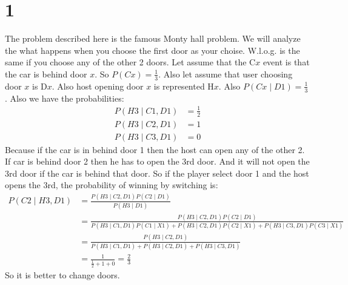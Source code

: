 \section*{1}
The problem described here is the famous Monty hall problem.
We will analyze the what happens when you choose the first door as
your choise. W.l.o.g. is the same if you choose any of the other 2 doors.
Let assume that the C$x$ event is that the car is behind door $x$.
So $P(Cx) = \frac{1}{3}$. Also let assume that user choosing door $x$ is D$x$.
Also host opening door $x$ is represented H$x$. Also $P(Cx\mid D1) = \frac{1}{3}$.
Also we have the probabilities:
\begin{align*}
P(H3\mid C1,D1) &= \frac{1}{2}\\
P(H3\mid C2,D1) &= 1\\
P(H3\mid C3,D1) &= 0
\end{align*}
Because if the car is in behind door 1 then the host can open any of the other 2.
If car is behind door 2 then he has to open the 3rd door. And it will not open the 
3rd door if the car is behind that door. So if the player select door 1 and the host
opens the 3rd, the probability of winning by switching is:
\begin{align*}
P(C2\mid H3,D1) &= \frac{P(H3\mid C2,D1) P(C2\mid D1)}{P(H3\mid D1)}\\
&= \frac{P(H3\mid C2,D1) P(C2\mid D1)}{P(H3\mid C1,D1) P(C1\mid X1) + P(H3\mid C2,D1) P(C2\mid X1) + P(H3\mid C3,D1) P(C3\mid X1)}\\
&= \frac{P(H3\mid C2,D1)}{P(H3\mid C1,D1) + P(H3\mid C2,D1) + P(H3\mid C3,D1)}\\
&= \frac{1}{\frac{1}{2} + 1 + 0} = \frac{2}{3}
\end{align*}
So it is better to change doors.
